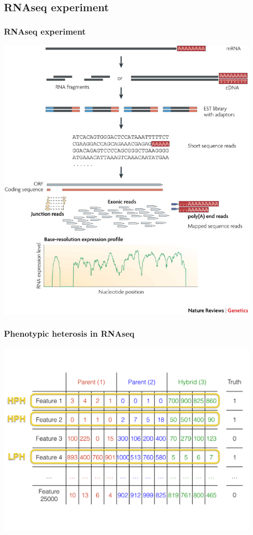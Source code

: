 \documentclass[handout]{beamer}\usepackage[]{graphicx}\usepackage[]{color}
\begin{document}
\subsection{RNAseq experiment}
\begin{frame}
\frametitle{RNAseq experiment}

\begin{center}
\includegraphics{rnaseq_experiment}
\end{center}

\end{frame}


\begin{frame}
\frametitle{Phenotypic heterosis in RNAseq}
\begin{center}
\includegraphics{heterosis_rnaseq}
\end{center}
\end{frame}
\end{document}
